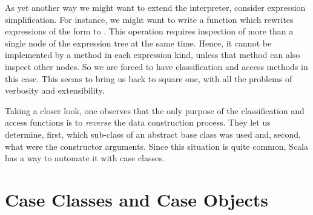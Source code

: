 As yet another way we might want to extend the interpreter, consider
expression simplification. For instance, we might want to write a
function which rewrites expressions of the form
 to . This operation requires inspection of 
more than a single node of the expression tree at the same
time. Hence, it cannot be implemented by a method in each expression
kind, unless that method can also inspect other nodes. So we are
forced to have classification and access methods in this case. This
seems to bring us back to square one, with all the problems of
verbosity and extensibility.

Taking a closer look, one observes that the only purpose of the
classification and access functions is to {\em reverse} the data
construction process.  They let us determine, first, which sub-class
of an abstract base class was used and, second, what were the
constructor arguments. Since this situation is quite common, Scala has
a way to automate it with case classes. 

\section{Case Classes and Case Objects}

